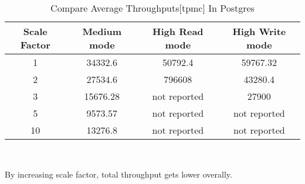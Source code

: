 \documentclass[../main.tex]{subfiles}
\begin{document}
\begin{table}
    \begin{center}
        \begin{tabular}{ |c|c|c|c| } 
            \hline
            Scale Factor & Medium mode & High Read mode & High Write mode\\
            \hline
            1 & 34332.6 & 50792.4 & 59767.32 \\
            2 & 27534.6 & 796608 & 43280.4 \\
            3 & 15676.28 & not reported & 27900 \\
            5 & 9573.57 & not reported & not reported \\
            10 & 13276.8 & not reported & not reported \\
            \hline
        \end{tabular}
        \\[1pt]
        \caption{Compare Average Throughputs[tpmc] In Postgres}
    \end{center}
\end{table}
By increasing scale factor, total throughput gets lower overally.
\end{document}
